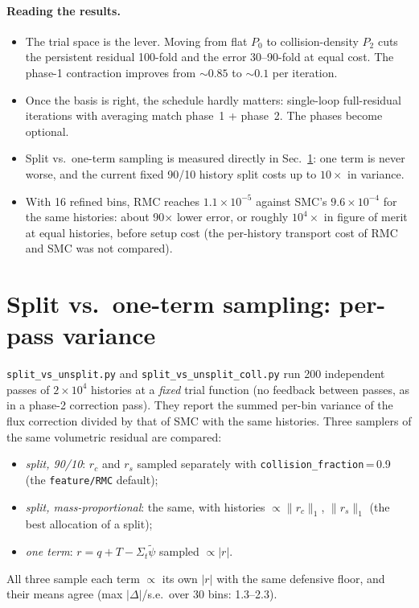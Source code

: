 \documentclass[11pt]{article}
\newcommand{\tpsi}{\tilde\psi}
\newcommand{\Sigt}{\Sigma_t}
\begin{document}
\paragraph{Reading the results.}
\begin{itemize}
  \item The trial space is the lever. Moving from flat $P_0$ to collision-density $P_2$
  cuts the persistent residual 100-fold and the error 30--90-fold at equal cost. The
  phase-1 contraction improves from $\sim0.85$ to $\sim0.1$ per iteration.
  \item Once the basis is right, the schedule hardly matters: single-loop full-residual
  iterations with averaging match phase~1 + phase~2. The phases become optional.
  \item Split vs.\ one-term sampling is measured directly in
  Sec.~\ref{sec:split}: one term is never worse, and the current fixed 90/10 history
  split costs up to $10\times$ in variance.
  \item With 16 refined bins, RMC reaches $1.1\times10^{-5}$ against SMC's
  $9.6\times10^{-4}$ for the same histories: about 90$\times$ lower error, or roughly
  $10^4\times$ in figure of merit at equal histories, before setup cost (the per-history
  transport cost of RMC and SMC was not compared).
\end{itemize}


\section{Split vs.\ one-term sampling: per-pass variance}\label{sec:split}

\texttt{split\_vs\_unsplit.py} and \texttt{split\_vs\_unsplit\_coll.py} run 200
independent passes of $2\times10^4$ histories at a \emph{fixed} trial function (no
feedback between passes, as in a phase-2 correction pass). They report the summed per-bin
variance of the flux correction divided by that of SMC with the same histories. Three
samplers of the same volumetric residual are compared:
\begin{itemize}
  \item \emph{split, 90/10}: $r_c$ and $r_s$ sampled separately with
  \texttt{collision\_fraction}\,=\,0.9 (the \texttt{feature/RMC} default);
  \item \emph{split, mass-proportional}: the same, with histories $\propto\|r_c\|_1$,
  $\|r_s\|_1$ (the best allocation of a split);
  \item \emph{one term}: $r=q+T-\Sigt\tpsi$ sampled $\propto|r|$.
\end{itemize}
All three sample each term $\propto$ its own $|r|$ with the same defensive floor, and
their means agree (max $|\Delta|$/s.e.\ over 30 bins: 1.3--2.3).
\end{document}
